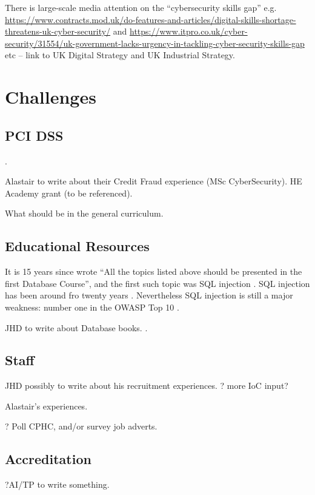 \documentclass[sigconf]{acmart}
\begin{document}
There is large-scale media
attention on the ``cybersecurity skills gap''
e.g. \url{https://www.contracts.mod.uk/do-features-and-articles/digital-skills-shortage-threatens-uk-cyber-security/}
and
\url{https://www.itpro.co.uk/cyber-security/31554/uk-government-lacks-urgency-in-tackling-cyber-security-skills-gap}
etc -- link to UK Digital Strategy and UK Industrial Strategy.

\section{Challenges}


\subsection{PCI DSS}
\cite{PCI2018b}.

Alastair to write about their Credit Fraud experience (MSc CyberSecurity).
HE Academy grant (to be referenced).

What should be in the general curriculum.

\subsection{Educational Resources}
It is 15 years since \cite{Guimaraesetal2004} 
wrote ``All the topics listed above should be presented in the first
Database Course'', and the first such topic was SQL injection \cite{Anonymous2018b}. SQL injection has been around fro twenty years \cite{HornerHyslip2017a}. Nevertheless SQL injection is still a major weakness: number one in the OWASP Top 10 \cite{OWASP2017a}. 

JHD to write about Database books. \cite{Drop2019}.

\subsection{Staff}
JHD possibly to write about his recruitment experiences.  ? more IoC input?

Alastair's experiences.

? Poll CPHC, and/or survey job adverts.
\subsection{Accreditation}
?AI/TP to write something.
\end{document}
